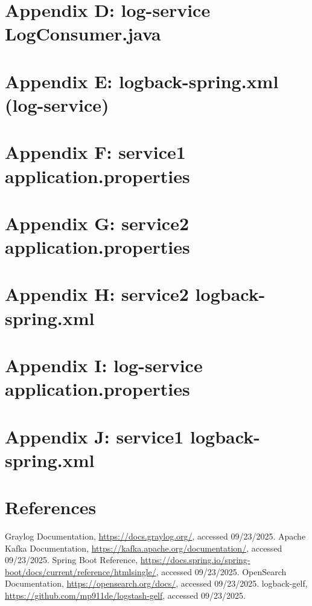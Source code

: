 \documentclass[12pt,a4paper]{report}
\begin{document}
\chapter{Appendix D: log-service LogConsumer.java}


\chapter{Appendix E: logback-spring.xml (log-service)}


\chapter{Appendix F: service1 application.properties}


\chapter{Appendix G: service2 application.properties}


\chapter{Appendix H: service2 logback-spring.xml}


\chapter{Appendix I: log-service application.properties}


\chapter{Appendix J: service1 logback-spring.xml}


\chapter*{References}
\begin{thebibliography}{9}
 Graylog Documentation, \url{https://docs.graylog.org/}, accessed 09/23/2025.
 Apache Kafka Documentation, \url{https://kafka.apache.org/documentation/}, accessed 09/23/2025.
 Spring Boot Reference, \url{https://docs.spring.io/spring-boot/docs/current/reference/htmlsingle/}, accessed 09/23/2025.
 OpenSearch Documentation, \url{https://opensearch.org/docs/}, accessed 09/23/2025.
 logback-gelf, \url{https://github.com/mp911de/logstash-gelf}, accessed 09/23/2025.
\end{thebibliography}
\end{document}
